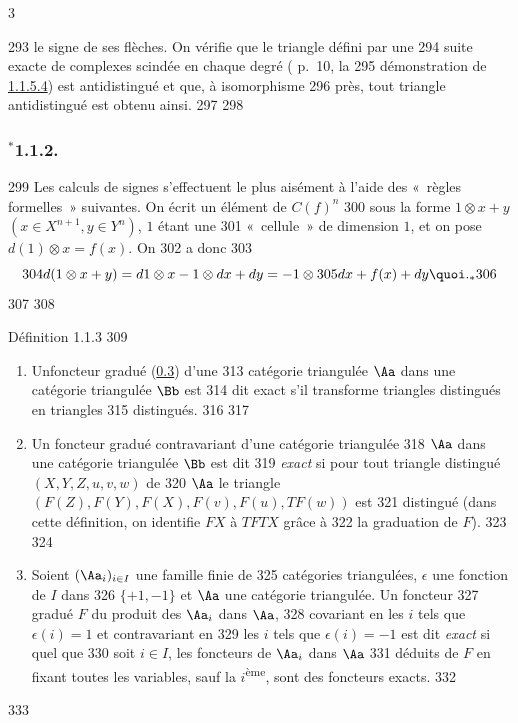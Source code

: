 3	\documentclass[10pt]{../fichiers-configuration-latex/smfart}
\begin{document}
   293	le signe de ses flèches. On vérifie que le triangle défini par une
   294	suite exacte de complexes scindée en chaque degré (\cite{CD} p.~10, \cf la
   295	démonstration de \hyperref[XVII.lem1.1.5.4]{1.1.5.4}) est antidistingué et que, à isomorphisme
   296	près, tout triangle antidistingué est obtenu ainsi.
   297	
   298	\subsubsection*{${}^{\ast}$1.1.2.}
   299	Les calculs de signes s'effectuent le plus aisément à l'aide des « règles formelles »  suivantes. On écrit un élément de $C(f)^{n}$
   300	sous la forme $1\otimes x+y$ $(x\in X^{n+1}, y\in Y^{n})$, $1$ étant une
   301	« cellule »  de dimension $1$, et on pose $d(1)\otimes x=f(x)$. On
   302	a donc
   303	\[
   304	d(1\otimes x+y)=d1\otimes x-1\otimes dx+dy=-1\otimes
   305	dx+f(x)+dy{\quoi}._{\ast}
   306	\]
   307	
   308	\begin{enonce*}{Définition 1.1.3}
   309	\begin{enumerate}
   310	\renewcommand{\theenumi}{\roman{enumi}}
   311	\renewcommand{\labelenumi}{(\theenumi)}
   312	\item Un\pageoriginale foncteur gradué (\hyperref[XVII.subsec0.3]{0.3}) d'une
   313	  catégorie triangulée $\Aa$ dans une catégorie triangulée $\Bb$ est
   314	  dit exact s'il transforme triangles distingués en triangles
   315	  distingués.
   316	
   317	\item Un foncteur gradué contravariant d'une catégorie triangulée
   318	  $\Aa$ dans une catégorie triangulée $\Bb$ est dit
   319	  \emph{exact} si pour tout triangle distingué $(X,Y,Z,u,v,w)$ de
   320	  $\Aa$ le triangle $(F(Z),F(Y), F(X), F(v),F(u),TF(w))$ est
   321	  distingué (dans cette définition, on identifie $FX$ à $TFTX$ grâce à
   322	  la graduation de $F$).
   323	
   324	\item Soient $(\Aa_i)_{i\in I}$ une famille finie de
   325	  catégories triangulées, $\epsilon$ une fonction de $I$ dans
   326	  $\{+1,-1\}$ et $\Aa$ une catégorie triangulée. Un foncteur
   327	  gradué $F$ du produit des $\Aa_i$ dans $\Aa$,
   328	  covariant en les $i$ tels que $\epsilon(i)=1$ et contravariant en
   329	  les $i$ tels que $\epsilon(i)=-1$ est dit \emph{exact} si quel que
   330	  soit $i\in I$, les foncteurs de $\Aa_i$ dans $\Aa$
   331	  déduits de $F$ en fixant toutes les variables, sauf la $i$\textsuperscript{ème}, sont des foncteurs exacts.
   332	\end{enumerate}
   333	\end{enonce*}
\end{document}
